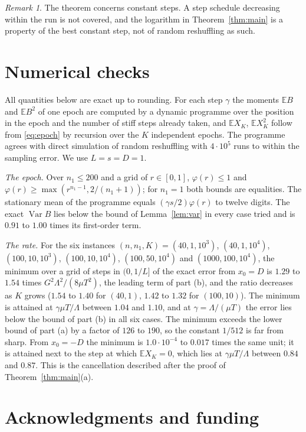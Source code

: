 \documentclass[11pt]{amsart}
\theoremstyle{remark}\newtheorem{remark}[theorem]{Remark}
\newcommand{\E}{\mathbb{E}}
\newcommand{\Var}{\operatorname{Var}}
\begin{document}
\begin{remark}
The theorem concerns constant steps. A step schedule decreasing within the run is not covered, and the logarithm in
Theorem~\ref{thm:main} is a property of the best constant step, not of random reshuffling as such.
\end{remark}

\section{Numerical checks}\label{sec:numerics}

All quantities below are exact up to rounding. For each step $\gamma$ the moments $\E B$ and $\E B^2$ of one epoch are
computed by a dynamic programme over the position in the epoch and the number of stiff steps already taken, and
$\E X_K$, $\E X_K^2$ follow from \eqref{eq:epoch} by recursion over the $K$ independent epochs. The programme agrees
with direct simulation of random reshuffling with $4\cdot10^5$ runs to within the sampling error. We use $L=s=D=1$.

\emph{The epoch.} Over $n_1\le200$ and a grid of $r\in[0,1]$, $\varphi(r)\le1$ and
$\varphi(r)\ge\max(r^{n_1-1},2/(n_1+1))$; for $n_1=1$ both bounds are equalities. The stationary mean of the
programme equals $(\gamma s/2)\varphi(r)$ to twelve digits. The exact $\Var B$ lies below the bound of
Lemma~\ref{lem:var} in every case tried and is $0.91$ to $1.00$ times its first-order term.

\emph{The rate.} For the six instances $(n,n_1,K)=(40,1,10^3)$, $(40,1,10^4)$, $(100,10,10^3)$, $(100,10,10^4)$,
$(100,50,10^4)$ and $(1000,100,10^4)$, the minimum over a
grid of steps in $(0,1/L]$ of the exact error from $x_0=D$ is $1.29$ to $1.54$ times $G^2\Lambda^2/(8\mu T^2)$, the
leading term of part (b), and the ratio decreases as $K$ grows ($1.54$ to $1.40$ for $(40,1)$, $1.42$ to $1.32$ for
$(100,10)$). The minimum is attained at $\gamma\mu T/\Lambda$ between $1.04$ and $1.10$, and at $\gamma=\Lambda/(\mu T)$
the error lies below the bound of part (b) in all six cases. The minimum exceeds the lower bound of part (a) by a
factor of $126$ to $190$, so the constant $1/512$ is far from sharp. From $x_0=-D$ the minimum is $1.0\cdot10^{-4}$ to
$0.017$ times the same unit; it is attained next to the step at which $\E X_K=0$, which lies at $\gamma\mu T/\Lambda$
between $0.84$ and $0.87$. This is the cancellation described after the proof of Theorem~\ref{thm:main}(a).

\section*{Acknowledgments and funding}
\end{document}
